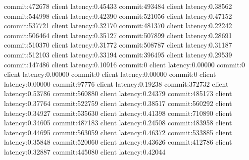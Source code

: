 commit:472678 client latency:0.45433
commit:493484 client latency:0.38562
commit:544998 client latency:0.42390
commit:521056 client latency:0.47152
commit:537721 client latency:0.32170
commit:481370 client latency:0.22242
commit:506464 client latency:0.35127
commit:507899 client latency:0.28691
commit:510370 client latency:0.31772
commit:508787 client latency:0.31187
commit:512103 client latency:0.33194
commit:396495 client latency:0.29539
commit:147486 client latency:0.10916
commit:0 client latency:0.00000
commit:0 client latency:0.00000
commit:0 client latency:0.00000
commit:0 client latency:0.00000
commit:97776 client latency:0.19238
commit:372732 client latency:0.53786
commit:560880 client latency:0.24379
commit:485173 client latency:0.37764
commit:522759 client latency:0.38517
commit:560292 client latency:0.34927
commit:535630 client latency:0.41398
commit:710890 client latency:0.34605
commit:487183 client latency:0.24508
commit:483958 client latency:0.44695
commit:563059 client latency:0.46372
commit:533885 client latency:0.35848
commit:520060 client latency:0.43626
commit:412786 client latency:0.32887
commit:445080 client latency:0.42044